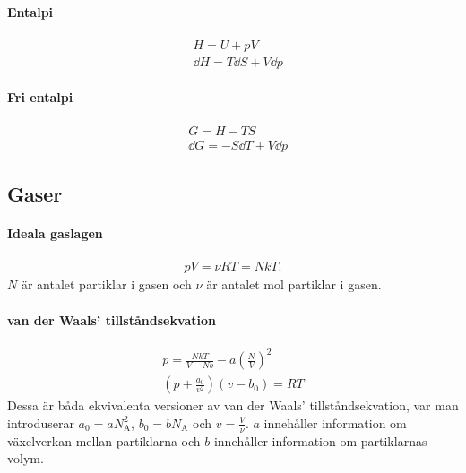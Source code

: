 \paragraph{Entalpi}
\begin{align*}
	& H = U + pV \\
	& \dd{H} = T\dd{S} + V\dd{p}
\end{align*}

\paragraph{Fri entalpi}
\begin{align*}
	& G = H - TS \\	
	& \dd{G} = -S\dd{T} + V \dd{p}
\end{align*}

\subsection{Gaser}

\paragraph{Ideala gaslagen}
\begin{align*}
	pV = \nu RT = NkT.
\end{align*}
$N$ är antalet partiklar i gasen och $\nu$ är antalet mol partiklar i gasen.

\paragraph{van der Waals' tillståndsekvation}
\begin{align*}
	p = \frac{NkT}{V - Nb} - a\left(\frac{N}{V}\right)^2\\
	\left(p + \frac{a_0}{v^2}\right)(v - b_0) = RT
\end{align*}
Dessa är båda ekvivalenta versioner av van der Waals' tillståndsekvation, var man introduserar $a_0 = a N_\text{A}^2$, $b_0 = bN_\text{A}$ och $v = \frac{V}{\nu}$. $a$ innehåller information om växelverkan mellan partiklarna och $b$ innehåller information om partiklarnas volym.

